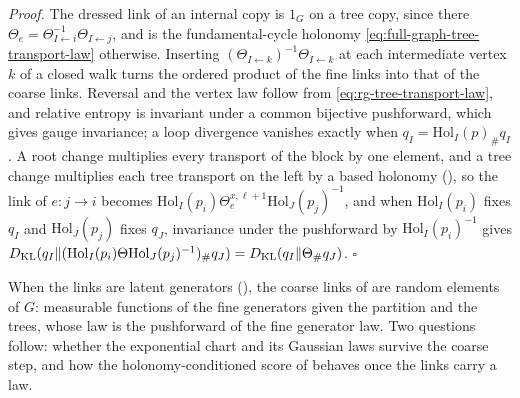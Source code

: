 \noindent\emph{Proof.}
The dressed link of an internal copy is $1_G$ on a tree copy, since there
$\Theta_e=\Theta_{I\leftarrow i}^{-1}\Theta_{I\leftarrow j}$, and is the
fundamental-cycle holonomy \eqref{eq:full-graph-tree-transport-law} otherwise.
Inserting $(\Theta_{I\leftarrow k})^{-1}\Theta_{I\leftarrow k}$ at each intermediate
vertex $k$ of a closed walk turns the ordered product of the fine links into that of
the coarse links. Reversal and the vertex law follow from
\eqref{eq:rg-tree-transport-law}, and relative entropy is invariant under a common
bijective pushforward, which gives gauge invariance; a loop divergence vanishes
exactly when $q_I=\mathrm{Hol}_I(p)_\#q_I$. A root change multiplies every transport
of the block by one element, and a tree change multiplies each tree transport on the
left by a based holonomy (), so the link of $e:j\to i$ becomes
$\mathrm{Hol}_I(p_i)\Theta^{x,\ell+1}_e\mathrm{Hol}_J(p_j)^{-1}$, and when
$\mathrm{Hol}_I(p_i)$ fixes $q_I$ and $\mathrm{Hol}_J(p_j)$ fixes $q_J$, invariance under
the pushforward by $\mathrm{Hol}_I(p_i)^{-1}$ gives
$D_{\mathrm{KL}}(q_I\Vert(\mathrm{Hol}_I(p_i)\Theta\mathrm{Hol}_J(p_j)^{-1})_\#q_J)=D_{\mathrm{KL}}(q_I\Vert\Theta_\#q_J)$. $\square$

When the links are latent generators (), the coarse links of
 are random elements of \(G\): measurable functions of the fine
generators given the partition and the trees, whose law is the pushforward of the fine generator law.
Two questions follow: whether the exponential chart and its Gaussian laws survive the coarse step, and
how the holonomy-conditioned score of  behaves once the links carry a
law.

